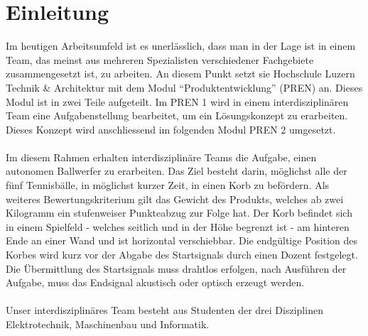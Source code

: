 \section{Einleitung}
Im heutigen Arbeitsumfeld ist es unerlässlich, dass man in der Lage ist in einem Team, das meinst aus mehreren Spezialisten verschiedener Fachgebiete zusammengesetzt ist, zu arbeiten. An diesem Punkt setzt sie Hochschule Luzern Technik \& Architektur mit dem Modul \enquote{Produktentwicklung} (PREN) an. Dieses Modul ist in zwei Teile aufgeteilt. Im PREN 1 wird in einem interdisziplinären Team eine Aufgabenstellung bearbeitet, um ein Lösungskonzept zu erarbeiten. Dieses Konzept wird anschliessend im folgenden Modul PREN 2 umgesetzt.\\
\\
Im diesem Rahmen erhalten interdisziplinäre Teams die Aufgabe, einen autonomen Ballwerfer zu erarbeiten. Das Ziel besteht darin, möglichst alle der fünf Tennisbälle, in möglichst kurzer Zeit, in einen Korb zu befördern. Als weiteres Bewertungskriterium gilt das Gewicht des Produkts, welches ab zwei Kilogramm ein stufenweiser Punkteabzug zur Folge hat. Der Korb befindet sich in einem Spielfeld - welches seitlich und in der Höhe begrenzt ist - am hinteren Ende an einer Wand und ist horizontal verschiebbar. Die endgültige Position des Korbes wird kurz vor der Abgabe des Startsignals durch einen Dozent festgelegt. Die Übermittlung des Startsignals muss drahtlos erfolgen, nach Ausführen der Aufgabe, muss das Endsignal akustisch oder optisch erzeugt werden.\\
\\
Unser interdisziplinäres Team besteht aus Studenten der drei Disziplinen Elektrotechnik, Maschinenbau und Informatik.\\
\\
